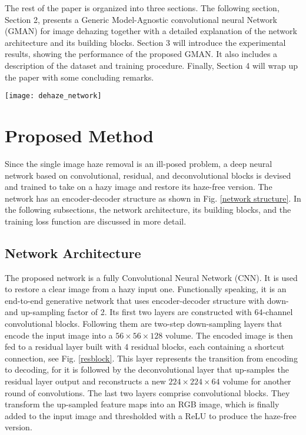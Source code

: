 \documentclass[journal]{IEEEtran}
\begin{document}
The rest of the paper is organized into three sections. The following section, Section 2, presents a Generic Model-Agnostic convolutional neural Network (GMAN) for image dehazing together with a detailed explanation of  the network architecture and its building blocks. Section 3 will introduce the experimental results, showing the performance of the proposed GMAN. It also includes a description of the dataset and training procedure. Finally, Section 4 will wrap up the paper with some concluding remarks.







\begin{figure*}
	\centering
	\texttt{[image: dehaze\_network]}
	\captionsetup{justification=centering}
	\centering\caption{Structure and details of GMAN. The yellow blocks are convolutional layers, the green blocks are down-sampling layers and deconvolutional layers. We cascade 4 residual blocks shown as blue blocks, and the number of convolutional layers inside are 2, 2, 3, 4.}
	\label{network structure}
\end{figure*}

\section{Proposed Method}

Since the single image haze removal is an ill-posed problem, a deep neural network based on convolutional, residual, and deconvolutional blocks is devised and trained to take on a hazy image and restore its haze-free version. The network has an encoder-decoder structure as shown in Fig. \ref{network structure}. In the following subsections, the network architecture, its building blocks, and the training loss function are discussed in more detail.

\subsection{Network Architecture}

The proposed network is a fully Convolutional Neural Network (CNN). It is used to restore a clear image from a hazy input one. Functionally speaking, it is an end-to-end generative network that uses encoder-decoder structure with down- and up-sampling factor of 2. Its first two layers are constructed with 64-channel convolutional blocks. Following them are two-step down-sampling layers that encode the input image into a $56\times56\times 128$ volume. The encoded image is then fed to a residual layer built with 4 residual blocks, each containing a shortcut connection, see Fig. \ref{resblock}. This layer represents the transition from encoding to decoding, for it is followed by the deconvolutional layer that up-samples the residual layer output and reconstructs a new $224\times224\times64$ volume for another round of convolutions. The last two layers comprise convolutional blocks. They transform the up-sampled feature maps into an RGB image, which is finally added to the input image and thresholded with a ReLU to produce the haze-free version.
\end{document}
